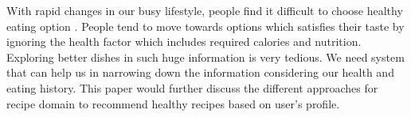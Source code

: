 With rapid changes in our busy lifestyle, people find it difficult to choose healthy eating option \cite{13}. People tend to move towards options which satisfies their taste by ignoring the health factor which includes required calories and nutrition. Exploring better dishes in such huge information is very tedious. We need system that can help us in narrowing down the information considering our health and eating history. This paper would further discuss the different approaches for recipe domain to recommend healthy recipes based on user's profile.


\pagebreak


